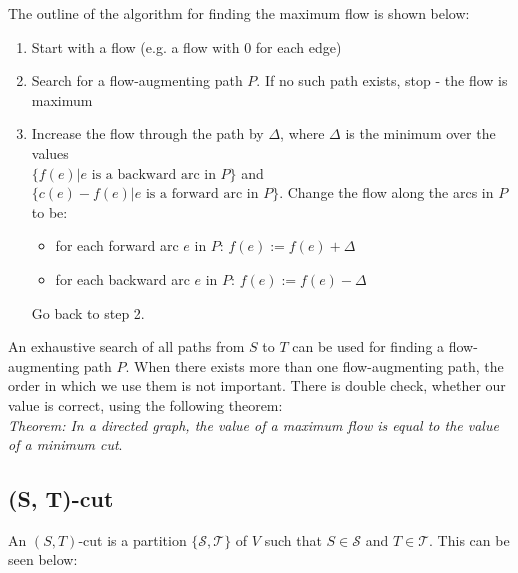 The outline of the algorithm for finding the maximum flow is shown below:
\begin{enumerate}
    \item Start with a flow (e.g. a flow with 0 for each edge)
    \item Search for a flow-augmenting path $P$. If no such path exists, stop - the flow is maximum
    \item Increase the flow through the path by $\Delta$, where $\Delta$ is the minimum over the values\\ $\{f(e)|e \text{ is a backward arc in }P\}$ and $\{c(e) - f(e)|e \text{ is a forward arc in }P\}$. Change the flow along the arcs in $P$ to be:
    \begin{itemize}
        \item for each forward arc $e$ in $P$: $f(e) := f(e) + \Delta$
        \item for each backward arc $e$ in $P$: $f(e) := f(e) - \Delta$
    \end{itemize}
    Go back to step 2. 
\end{enumerate}

An exhaustive search of all paths from $S$ to $T$ can be used for finding a flow-augmenting path $P$. When there exists more than one flow-augmenting path, the order in which we use them is not important. There is double check, whether our value is correct, using the following theorem:\\
\textit{Theorem: In a directed graph, the value of a maximum flow is equal to the value of a minimum cut}.

\subsection{(S, T)-cut}
An $(S, T)$-cut is a partition $\{\mathcal{S}, \mathcal{T}\}$ of $V$ such that $S \in \mathcal{S}$ and $T \in \mathcal{T}$. This can be seen below:

